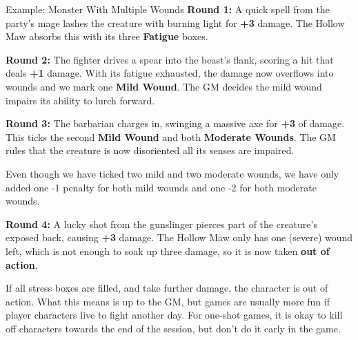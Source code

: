 \begin{multicols}{2}
\begin{Example}{Example: Monster With Multiple Wounds}
	\noindent\textbf{Round 1:}  
	A quick spell from the party’s mage lashes the creature with burning light for \textbf{+3} damage. The Hollow Maw absorbs this with its three \textbf{Fatigue} boxes.

	\vspace{0.5\baselineskip}
	\DamageBox[%
		totalfatigue=3,%
		totalmild=2,%
		totalmoderate=2,%
		totalsevere=1,%
		fatigue=3%
	]

	\noindent\textbf{Round 2:}  
	The fighter drives a spear into the beast’s flank, scoring a hit that deals \textbf{+1} damage. With its fatigue exhausted, the damage now overflows into wounds and we mark one \textbf{Mild Wound}. The GM decides the mild wound impairs its ability to lurch forward.

	\vspace{0.5\baselineskip}
	\DamageBox[%
		totalfatigue=3,%
		totalmild=2,%
		totalmoderate=2,%
		totalsevere=1,%
		fatigue=3,%
		mild=1,%
		mildtext=\textbf{Movement (-1)}%
	]

	\noindent\textbf{Round 3:} 
	The barbarian charges in, swinging a massive axe for \textbf{+3} of damage. This ticks the second \textbf{Mild Wound} and both \textbf{Moderate Wounds}. The GM rules that the creature is now disoriented all its senses are impaired.

	\vspace{0.5\baselineskip}
	\DamageBox[%
		totalfatigue=3,%
		totalmild=2,%
		totalmoderate=2,%
		totalsevere=1,%
		fatigue=3,%
		mild=2,%
		moderate=2,%
		mildtext=\textbf{Movement (-1)},%
		moderatetext=\textbf{Senses (-2)}%
	]

	Even though we have ticked two mild and two moderate wounds, we have only added one -1 penalty for both mild wounds and one -2 for both moderate wounds.

	\textbf{Round 4:}  
	A lucky shot from the gunslinger pierces part of the creature’s exposed back, causing \textbf{+3} damage. The Hollow Maw only has one (severe) wound left, which is not enough to soak up three damage, so it is now taken \textbf{out of action}.

	\vspace{0.5\baselineskip}
	\DamageBox[%
		fatigue=3,%
		mild=2,%
		mildtext=\textbf{Movement (-1)},%
		moderate=2,%
		moderatetext=\textbf{Senses (-2)},%
		severe=1,%
		severetext=\textbf{All Actions (-3)}%
	]
\end{Example}

If all stress boxes are filled, and take further damage, the character is out of action. What this means is up to the GM, but games are usually more fun if player characters live to fight another day. For one-shot games, it is okay to kill off characters towards the end of the session, but don't do it early in the game.



\end{multicols}
